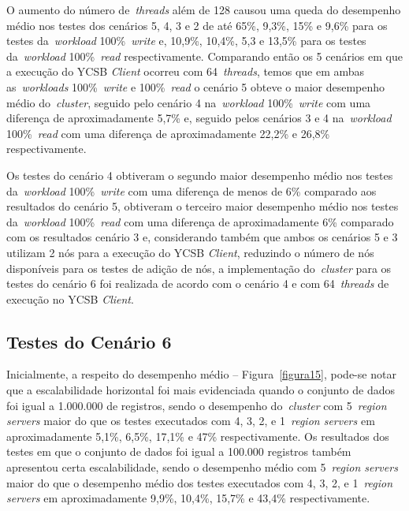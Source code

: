 \documentclass[12pt]{article}
\begin{document}
O aumento do número de~\emph{threads} além de 128 causou uma queda do desempenho médio nos testes dos cenários 5, 4, 3 e 2 de até 65\%, 9,3\%, 15\% e 9,6\% para os testes da~\emph{workload} 100\%~\emph{write} e, 10,9\%, 10,4\%, 5,3 e 13,5\% para os testes da~\emph{workload} 100\%~\emph{read} respectivamente. Comparando então os 5 cenários em que a execução do YCSB \emph{Client} ocorreu com 64~\emph{threads}, temos que em ambas as~\emph{workloads} 100\%~\emph{write} e 100\%~\emph{read} o cenário 5 obteve o maior desempenho médio do~\emph{cluster}, seguido pelo cenário 4 na~\emph{workload} 100\%~\emph{write} com uma diferença de aproximadamente 5,7\% e, seguido pelos cenários 3 e 4 na~\emph{workload} 100\%~\emph{read} com uma diferença de aproximadamente 22,2\% e 26,8\% respectivamente.

Os testes do cenário 4 obtiveram o segundo maior desempenho médio nos testes da~\emph{workload} 100\%~\emph{write} com uma diferença de menos de 6\% comparado aos resultados do cenário 5, obtiveram o terceiro maior desempenho médio nos testes da~\emph{workload} 100\%~\emph{read} com uma diferença de aproximadamente 6\% comparado com os resultados cenário 3 e, considerando também que ambos os cenários 5 e 3 utilizam 2 nós para a execução do YCSB \emph{Client}, reduzindo o número de nós disponíveis para os testes de adição de nós, a implementação do~\emph{cluster} para os testes do cenário 6 foi realizada de acordo com o cenário 4 e com 64~\emph{threads} de execução no YCSB \emph{Client}.


\subsection{Testes do Cenário 6}

Inicialmente, a respeito do desempenho médio -- Figura~\ref{figura15}, pode-se notar que a escalabilidade horizontal foi mais evidenciada quando o conjunto de dados foi igual a 1.000.000 de registros, sendo o desempenho do~\emph{cluster} com 5~\emph{region servers} maior do que os testes executados com 4, 3, 2, e 1~\emph{region servers} em aproximadamente 5,1\%, 6,5\%, 17,1\% e 47\% respectivamente. 
Os resultados dos testes em que o conjunto de dados foi igual a 100.000 registros também apresentou certa escalabilidade, sendo o desempenho médio com 5~\emph{region servers} maior do que o desempenho médio dos testes executados com 4, 3, 2, e 1~\emph{region servers} em aproximadamente 9,9\%, 10,4\%, 15,7\% e 43,4\% respectivamente.
\end{document}
